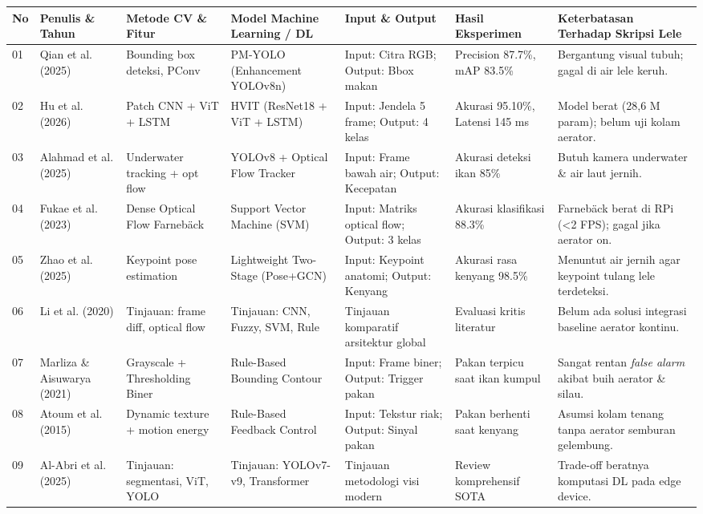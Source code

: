 \documentclass[10pt,a4paper]{article}
\begin{document}
{\scriptsize
\setlength{\tabcolsep}{2pt}
\begin{longtable}{@{}p{0.4cm} p{2.8cm} p{2.8cm} p{2.6cm} p{2.4cm} p{2.2cm} p{3.2cm}@{}}
\toprule
\textbf{No} & \textbf{Penulis \& Tahun} & \textbf{Metode CV \& Fitur} & \textbf{Model Machine Learning / DL} & \textbf{Input \& Output} & \textbf{Hasil Eksperimen} & \textbf{Keterbatasan Terhadap Skripsi Lele} \\
\midrule
\endhead
01 & Qian et al. (2025) & Bounding box deteksi, PConv & PM-YOLO (Enhancement YOLOv8n) & Input: Citra RGB; Output: Bbox makan & Precision 87.7\%, mAP 83.5\% & Bergantung visual tubuh; gagal di air lele keruh. \\
02 & Hu et al. (2026) & Patch CNN + ViT + LSTM & HVIT (ResNet18 + ViT + LSTM) & Input: Jendela 5 frame; Output: 4 kelas & Akurasi 95.10\%, Latensi 145 ms & Model berat (28,6 M param); belum uji kolam aerator. \\
03 & Alahmad et al. (2025) & Underwater tracking + opt flow & YOLOv8 + Optical Flow Tracker & Input: Frame bawah air; Output: Kecepatan & Akurasi deteksi ikan 85\% & Butuh kamera underwater \& air laut jernih. \\
04 & Fukae et al. (2023) & Dense Optical Flow Farnebäck & Support Vector Machine (SVM) & Input: Matriks optical flow; Output: 3 kelas & Akurasi klasifikasi 88.3\% & Farnebäck berat di RPi (<2 FPS); gagal jika aerator on. \\
05 & Zhao et al. (2025) & Keypoint pose estimation & Lightweight Two-Stage (Pose+GCN) & Input: Keypoint anatomi; Output: Kenyang & Akurasi rasa kenyang 98.5\% & Menuntut air jernih agar keypoint tulang lele terdeteksi. \\
06 & Li et al. (2020) & Tinjauan: frame diff, optical flow & Tinjauan: CNN, Fuzzy, SVM, Rule & Tinjauan komparatif arsitektur global & Evaluasi kritis literatur & Belum ada solusi integrasi baseline aerator kontinu. \\
07 & Marliza \& Aisuwarya (2021) & Grayscale + Thresholding Biner & Rule-Based Bounding Contour & Input: Frame biner; Output: Trigger pakan & Pakan terpicu saat ikan kumpul & Sangat rentan \textit{false alarm} akibat buih aerator \& silau. \\
08 & Atoum et al. (2015) & Dynamic texture + motion energy & Rule-Based Feedback Control & Input: Tekstur riak; Output: Sinyal pakan & Pakan berhenti saat kenyang & Asumsi kolam tenang tanpa aerator semburan gelembung. \\
09 & Al-Abri et al. (2025) & Tinjauan: segmentasi, ViT, YOLO & Tinjauan: YOLOv7-v9, Transformer & Tinjauan metodologi visi modern & Review komprehensif SOTA & Trade-off beratnya komputasi DL pada edge device. \\

\end{longtable}}
\end{document}
